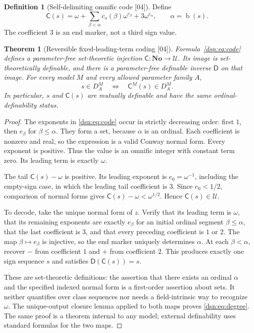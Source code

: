 \documentclass[11pt,a4paper]{article}
\numberwithin{equation}{section}
\newtheorem{theorem}{Theorem}[section]
\theoremstyle{definition}
\newtheorem{definition}[definition]{Definition}
\theoremstyle{remark}
\newcommand{\No}{\mathbf{No}}
\newcommand{\bd}{\operatorname{b}}
\newcommand{\Code}{\mathsf C}
\newcommand{\Decode}{\mathsf D}
\newcommand{\Cell}{\mathcal U}
\newcommand{\src}[1]{\textup{\textsf{\small[#1]}}}
\begin{document}
\begin{definition}[Self-delimiting omnific code \src{04}]\label{dsn:def:code}
Define
\begin{equation}\label{dsn:eq:code}
 \Code(s)=\omega+
       \sum_{\beta<\alpha}c_s(\beta)\omega^{e_\beta}
       +3\omega^{e_\alpha},\qquad\alpha=\bd(s).
\end{equation}
The coefficient $3$ is an end marker, not a third sign value.
\end{definition}

\begin{theorem}[Reversible fixed-leading-term coding \src{04}]\label{dsn:thm:code}
Formula~\eqref{dsn:eq:code} defines a parameter-free set-theoretic injection
$\Code:\No\to\Cell$. Its image is set-theoretically definable, and
there is a parameter-free definable inverse $\Decode$ on that image.
For every model $M$ and every allowed parameter family $A$,
\begin{equation}\label{dsn:eq:degree}
 s\in D_A^M\quad\Longleftrightarrow\quad\Code^M(s)\in D_A^M.
\end{equation}
In particular, $s$ and $\Code(s)$ are mutually definable and have the
same ordinal-definability status.
\end{theorem}
\begin{proof}
The exponents in \eqref{dsn:eq:code} occur in strictly decreasing order:
first $1$, then $e_\beta$ for $\beta\leq\alpha$. They form a set,
because $\alpha$ is an ordinal. Each coefficient is nonzero and real,
so the expression is a valid Conway normal form. Every exponent is
positive. Thus the value is an omnific integer with constant term zero.
Its leading term is exactly $\omega$.

The tail $\Code(s)-\omega$ is positive. Its leading exponent is
$e_0=\omega^{-1}$, including the empty-sign case, in which the leading
tail coefficient is $3$. Since $e_0<1/2$, comparison of normal forms
gives $\Code(s)-\omega<\omega^{1/2}$. Hence $\Code(s)\in\Cell$.

To decode, take the unique normal form of $z$. Verify that its leading
term is $\omega$, that its remaining exponents are exactly
$e_\beta$ for an initial ordinal segment $\beta\leq\alpha$, that
the last coefficient is $3$, and that every preceding coefficient is
$1$ or $2$. The map $\beta\mapsto e_\beta$ is injective, so the end
marker uniquely determines $\alpha$. At each $\beta<\alpha$, recover
$-$ from coefficient $1$ and $+$ from coefficient $2$. This produces
exactly one sign sequence $s$ and satisfies $\Decode(\Code(s))=s$.

These are set-theoretic definitions: the assertion that there exists
an ordinal $\alpha$ and the specified indexed normal form is a
first-order assertion about sets. It neither quantifies over class
sequences nor needs a field-intrinsic way to recognize $\omega$.
The unique-output closure lemma applied to both maps proves
\eqref{dsn:eq:degree}. The same proof is a theorem internal to any model;
external definability uses standard formulas for the two maps.
\end{proof}
\end{document}
